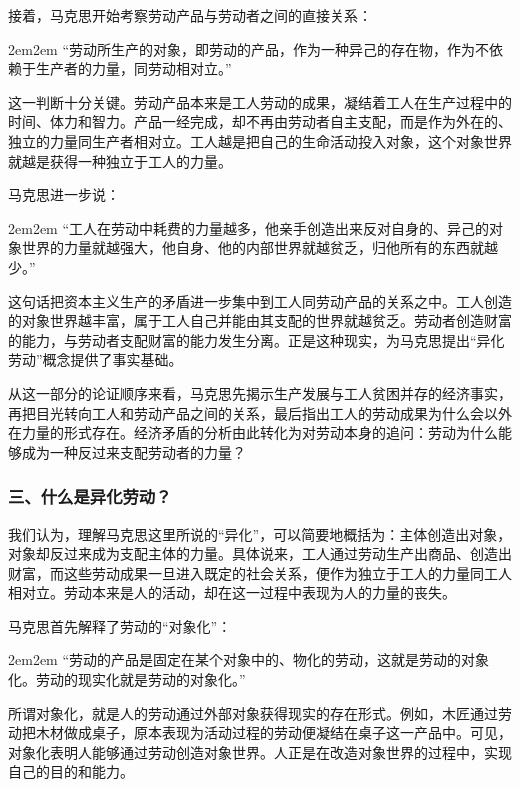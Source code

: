 \documentclass[a4paper,twoside,12pt,AutoFakeBold]{ctexart}
\begin{document}
接着，马克思开始考察劳动产品与劳动者之间的直接关系：

\begin{adjustwidth}{2em}{2em}
\qquad\fangsong
“劳动所生产的对象，即劳动的产品，作为一种异己的存在物，作为不依赖于生产者的力量，同劳动相对立。”
\end{adjustwidth}

这一判断十分关键。劳动产品本来是工人劳动的成果，凝结着工人在生产过程中的时间、体力和智力。产品一经完成，却不再由劳动者自主支配，而是作为外在的、独立的力量同生产者相对立。工人越是把自己的生命活动投入对象，这个对象世界就越是获得一种独立于工人的力量。

马克思进一步说：

\begin{adjustwidth}{2em}{2em}
\qquad\fangsong
“工人在劳动中耗费的力量越多，他亲手创造出来反对自身的、异己的对象世界的力量就越强大，他自身、他的内部世界就越贫乏，归他所有的东西就越少。”
\end{adjustwidth}

这句话把资本主义生产的矛盾进一步集中到工人同劳动产品的关系之中。工人创造的对象世界越丰富，属于工人自己并能由其支配的世界就越贫乏。劳动者创造财富的能力，与劳动者支配财富的能力发生分离。正是这种现实，为马克思提出“异化劳动”概念提供了事实基础。

从这一部分的论证顺序来看，马克思先揭示生产发展与工人贫困并存的经济事实，再把目光转向工人和劳动产品之间的关系，最后指出工人的劳动成果为什么会以外在力量的形式存在。经济矛盾的分析由此转化为对劳动本身的追问：劳动为什么能够成为一种反过来支配劳动者的力量？

\subsubsection{三、什么是异化劳动？}\label{sec:3.3}

我们认为，理解马克思这里所说的“异化”，可以简要地概括为：主体创造出对象，对象却反过来成为支配主体的力量。具体说来，工人通过劳动生产出商品、创造出财富，而这些劳动成果一旦进入既定的社会关系，便作为独立于工人的力量同工人相对立。劳动本来是人的活动，却在这一过程中表现为人的力量的丧失。

马克思首先解释了劳动的“对象化”：

\begin{adjustwidth}{2em}{2em}
\qquad\fangsong
“劳动的产品是固定在某个对象中的、物化的劳动，这就是劳动的对象化。劳动的现实化就是劳动的对象化。”
\end{adjustwidth}

所谓对象化，就是人的劳动通过外部对象获得现实的存在形式。例如，木匠通过劳动把木材做成桌子，原本表现为活动过程的劳动便凝结在桌子这一产品中。可见，对象化表明人能够通过劳动创造对象世界。人正是在改造对象世界的过程中，实现自己的目的和能力。
\end{document}

